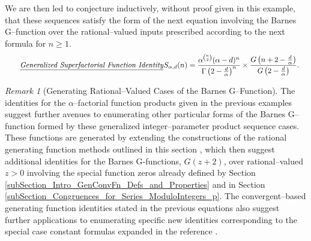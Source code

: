 \documentclass[12pt,reqno]{article}
\numberwithin{sfootnote}{section}
\numberwithin{equation}{section}
\newcommand{\tagtext}[1]{\tag*{\underline{\textit{#1}}}}
\theoremstyle{plain}
\theoremstyle{definition}
\theoremstyle{remark}
\newtheorem{remark}[theorem]{Remark}
\begin{document}
We are then led to conjecture inductively, without proof 
given in this example, that these sequences satisfy the form of the 
next equation involving the Barnes G--function over the 
rational--valued inputs prescribed according to the 
next formula for $n \geq 1$. 
\begin{align*} 
\tagtext{Generalized Superfactorial Function Identity} 
S_{\alpha,d}(n) 
     & = 
     \frac{\alpha^{\binom{n}{2}} (\alpha - d)^{n}}{ 
     \Gamma\left(2 - \frac{d}{\alpha}\right)^{n}} \times 
     \frac{G\left(n + 2 - \frac{d}{\alpha}\right)}{ 
     G\left(2 - \frac{d}{\alpha}\right)}. 
\end{align*} 

\begin{remark}[Generating Rational--Valued Cases of the Barnes G--Function] 
The identities for the $\alpha$--factorial function products given in the 
previous examples suggest further avenues to 
enumerating other particular forms of the Barnes G--function formed by these 
generalized integer--parameter product sequence cases. 
These functions are generated by extending the constructions of the 
rational generating function methods outlined in this section 
\citep{CONTRIB-THEORY-BARNESGFN,ON-HYPGEOMFNS-PHKSYMBOL}, 
which then suggest additional identities for the Barnes G-functions, 
$G(z+2)$, over rational--valued $z > 0$ 
involving the special function zeros already defined by 
Section \ref{subSection_Intro_GenConvFn_Defs_and_Properties} and in 
Section \ref{subSection_Congruences_for_Series_ModuloIntegers_p}. 
The convergent--based generating function identities stated in the 
previous equations also suggest further applications to 
enumerating specific new identities corresponding to the 
special case constant formulas expanded in the reference 
\citep[\S 2]{CONTRIB-THEORY-BARNESGFN}. 
\end{remark} 
\end{document}
